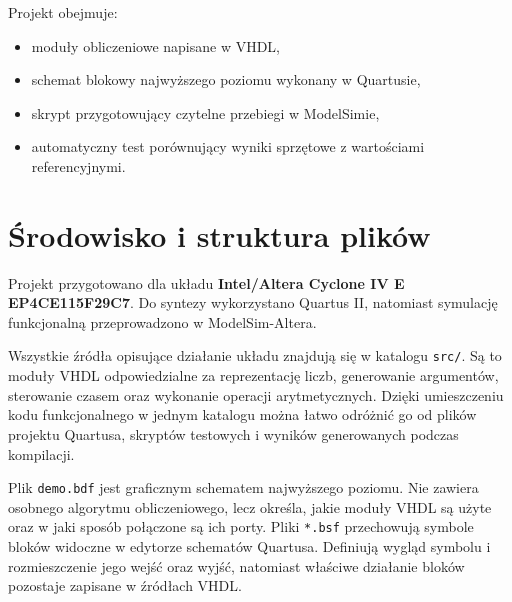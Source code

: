 \documentclass[12pt,a4paper]{article}
\begin{document}
Projekt obejmuje:

\begin{itemize}
    \item moduły obliczeniowe napisane w VHDL,
    \item schemat blokowy najwyższego poziomu wykonany w Quartusie,
    \item skrypt przygotowujący czytelne przebiegi w ModelSimie,
    \item automatyczny test porównujący wyniki sprzętowe z wartościami
          referencyjnymi.
\end{itemize}

\section{Środowisko i struktura plików}

Projekt przygotowano dla układu \textbf{Intel/Altera Cyclone IV E
EP4CE115F29C7}. Do syntezy wykorzystano Quartus II, natomiast symulację
funkcjonalną przeprowadzono w ModelSim-Altera.

Wszystkie źródła opisujące działanie układu znajdują się w katalogu
\texttt{src/}. Są to moduły VHDL odpowiedzialne za reprezentację liczb,
generowanie argumentów, sterowanie czasem oraz wykonanie operacji
arytmetycznych. Dzięki umieszczeniu kodu funkcjonalnego w jednym katalogu
można łatwo odróżnić go od plików projektu Quartusa, skryptów testowych
i wyników generowanych podczas kompilacji.

Plik \texttt{demo.bdf} jest graficznym schematem najwyższego poziomu.
Nie zawiera osobnego algorytmu obliczeniowego, lecz określa, jakie moduły
VHDL są użyte oraz w jaki sposób połączone są ich porty. Pliki
\texttt{*.bsf} przechowują symbole bloków widoczne w edytorze schematów
Quartusa. Definiują wygląd symbolu i rozmieszczenie jego wejść oraz wyjść,
natomiast właściwe działanie bloków pozostaje zapisane w źródłach VHDL.
\end{document}
